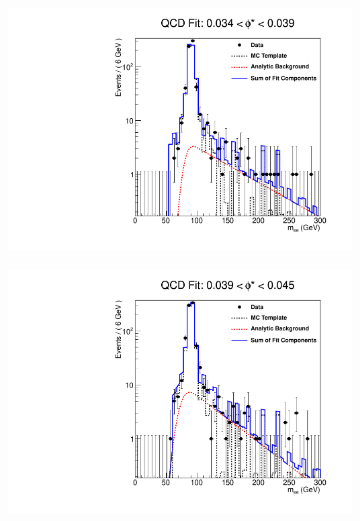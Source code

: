 \begin{figure}[!htbp]
    \centering
    \begin{subfigure}[b]{\SideBySidePlotWidth}
        \includegraphics[width=\linewidth]{figures/qcd_fits/qcd_fit_plot_for_09.pdf}
        \caption{}
        \label{fig:qcd_fit_09}
    \end{subfigure}%
    \begin{subfigure}[b]{\SideBySidePlotWidth}
        \includegraphics[width=\linewidth]{figures/qcd_fits/qcd_fit_plot_for_10.pdf}
        \caption{}
        \label{fig:qcd_fit_10}
    \end{subfigure}
    \begin{subfigure}[b]{\SideBySidePlotWidth}

\end{subfigure}
\end{figure}
